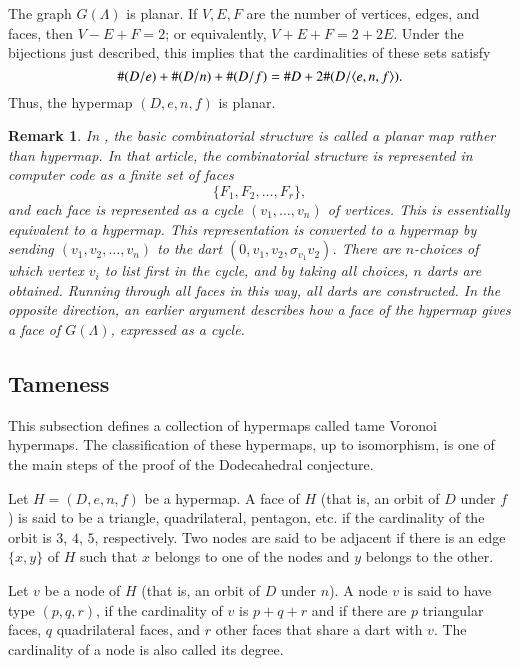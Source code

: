 \documentclass{article} %
\newtheorem{remark}[lemma]{Remark}
\begin{document}
The graph $G(\Lambda)$ is planar.  If $V,E,F$ are the number of vertices, edges,
and faces, then $V-E+F=2$; or equivalently, $V+E+F = 2 + 2E$.
Under the bijections just described, this implies that the cardinalities
of these sets satisfy
$$
     \#(D/e) + \#(D/n) + \#(D/f) = \# D + 2\#(D/\langle e,n,f\rangle).
$$
Thus, the hypermap $(D,e,n,f)$ is planar.

\begin{remark}
In \cite{Hales:2002:Dodec}, the basic combinatorial structure is called a {\it planar map} rather
than hypermap.  In that article, the combinatorial structure is represented in
computer code as a finite set of faces
 $$
  \{F_1,F_2,\ldots,F_r\},
 $$
and each face is represented as a cycle $(v_1,\ldots,v_n)$ of vertices.  This is
essentially equivalent to a hypermap.  This representation
is converted to a hypermap by sending $(v_1,v_2,\ldots,v_n)$ to the dart
$(0,v_1,v_2,\sigma_{v_1} v_2)$.  There are $n$-choices of which vertex $v_i$ to list
first in the cycle, and by taking all choices, $n$ darts are obtained.  Running
through all faces in this way, all darts are constructed.  In the opposite direction,
an earlier argument describes how a face of the hypermap gives a face of $G(\Lambda)$,
expressed as a cycle.
\end{remark}

\subsection{Tameness}

This subsection defines a collection of hypermaps called tame Voronoi hypermaps.
The classification of these hypermaps, up to isomorphism, is one of the main steps
of the proof of the Dodecahedral conjecture.

Let $H=(D,e,n,f)$ be a hypermap.  A face of $H$ (that is, an orbit
of $D$ under $f$) is said to be a triangle, quadrilateral, pentagon, etc. if the cardinality
of the orbit is $3$, $4$, $5$, respectively.  Two nodes are said
to be adjacent
if there is an edge $\{x,y\}$ of $H$ such that $x$ belongs to one of the nodes and
$y$ belongs to the other.

  Let $v$ be a node of $H$ (that is, an orbit
of $D$ under $n$).  
A node $v$ is said to have type $(p,q,r)$, if the cardinality of $v$ is $p+q+r$ and if
there are $p$ triangular faces, $q$ quadrilateral faces, and $r$ other faces
that share a dart with $v$.  The cardinality of a node is also
called its degree.
\end{document}
